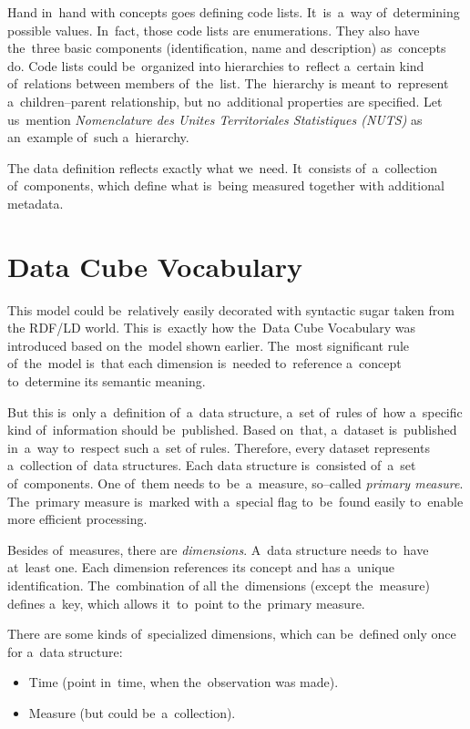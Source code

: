 \label{SDMX-code-lists}
Hand in~hand with concepts goes defining code lists. It~is~a~way of~determining possible
values. In~fact, those code lists are enumerations. They also have the~three basic components
(identification, name and description) as~concepts do. Code lists could be~organized into
hierarchies to~reflect a~certain kind of~relations between members of~the~list. The~hierarchy
is meant to~represent a~children--parent relationship, but no~additional properties are specified.
Let us~mention \emph{Nomenclature des Unites Territoriales Statistiques (NUTS)} 
as an~example of~such a~hierarchy.

The data definition reflects exactly what we~need. It~consists of~a~collection of~components, which define what is~being measured together with additional metadata.

\section{Data Cube Vocabulary}
\label{datacube-vocabulary}

This model could be~relatively easily decorated with syntactic sugar taken from the
RDF/LD world. This is~exactly how the~Data Cube Vocabulary was introduced based
on the~model shown earlier. The~most significant rule of~the~model is~that each
dimension is~needed to~reference a~concept to~determine its semantic meaning.

But this is~only a~definition of~a~data structure, a~set of~rules of~how a~specific kind of~information
should be~published. Based on~that, a~dataset is~published in~a~way to~respect such a~set
of rules. Therefore, every dataset represents a~collection of~data structures. Each data
structure is~consisted of~a~set of~components. One of~them needs to~be~a~measure,
so--called \emph{primary measure}. The~primary measure is~marked with a~special flag to~be~found
easily to~enable more efficient processing.

Besides of~measures, there are \emph{dimensions}. A~data structure needs to~have at~least one.
Each dimension references its concept and has a~unique identification. The~combination of
all the~dimensions (except the~measure) defines a~key, which allows it~to~point
to the~primary measure.

There are some kinds of~specialized dimensions, which can be~defined only once
for a~data structure:

\begin{itemize}
\item Time (point in~time, when the~observation was made).
\item Measure (but could be~a~collection).
\end{itemize}

